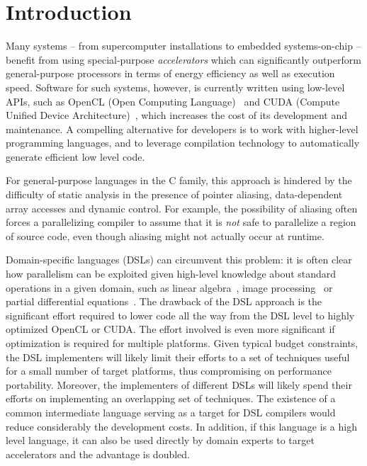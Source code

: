 \section{Introduction}

Many systems -- from supercomputer installations to embedded
systems-on-chip -- benefit from using special-purpose
{\em accelerators} which can significantly outperform general-purpose
processors in terms of energy efficiency as well as
execution speed.
Software for such systems, however, is currently written using
low-level APIs,
such as OpenCL (Open Computing Language)~\cite{stoneopencl} and
CUDA (Compute Unified Device Architecture)~\cite{cudaref},
which increases the cost of
its development and maintenance.
A compelling alternative for developers is to work with higher-level
programming languages, and to leverage compilation technology to automatically
generate efficient low level code.

For general-purpose languages in the C family, this approach is hindered
by the difficulty of static analysis in the presence of pointer aliasing,
data-dependent array accesses and dynamic control.
For example, the possibility of aliasing often forces a parallelizing compiler
to assume that it is \emph{not} safe to parallelize a region of source
code, even though aliasing might not actually
occur at runtime.

Domain-specific languages (DSLs)
can circumvent this problem: it is often
clear how parallelism can be exploited given
high-level knowledge about standard operations in a given domain, such as
linear algebra~\cite{vobla2014},
image processing~\cite{DBLP:conf/pldi/Ragan-KelleyBAPDA13}
or partial differential equations~\cite{DBLP:journals/toms/AlnaesLORW14}.
The drawback of the DSL approach is the significant effort required to
lower code all the way from the DSL level to highly optimized OpenCL or CUDA.
The effort involved is even more significant if optimization is required
for multiple platforms.
Given typical budget constraints, the DSL implementers will
likely limit their efforts to a set of techniques useful for a small
number of target platforms, thus
compromising on performance portability.  Moreover, the implementers
of different DSLs will likely spend their efforts on implementing an
overlapping set of techniques.
The existence of a common intermediate language serving as a target
for DSL compilers would reduce considerably the development costs.
In addition, if this language is a high level language, it can also
be used directly by domain experts to target accelerators and the
advantage is doubled.

